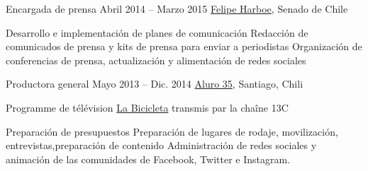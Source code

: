 \begin{joblist}
{		%
	}



\item[Encargada de prensa ]{Abril 2014 -- Marzo 2015}
     { \href{https://www.harboe.cl/}{Felipe Harboe}, Senado de Chile } 
	 {
                
		\iftbftiny \vspace{-0.5cm} \fi
			\begin{itemize}
			  \iftbftiny \setlength\itemsep{-3pt} \fi
			  \cvitem[\checkmark] Desarrollo e implementación de planes de comunicación
			  \cvitem[\checkmark] Redacción de comunicados de prensa y kits de prensa para enviar a periodistas
			  \cvitem[\checkmark] Organización de conferencias de prensa, actualización y alimentación de redes sociales
			\end{itemize}     
			
	}
    
    
    
\item[Productora general]{Mayo 2013 -- Dic. 2014}
     {\href{https://www.aluro35.com/}  {Aluro 35}, Santiago, Chili}
     {Programme de télévision \href{http://www.13.cl/c/programas/la-bicicleta}{La Bicicleta} transmis par la chaîne 13C \\
			
		\iftbftiny \vspace{-0.5cm} \fi
			\begin{itemize}
			  \iftbftiny \setlength\itemsep{-3pt} \fi
			  \cvitem[\checkmark] Preparación de presupuestos                
			  \cvitem[\checkmark] Preparación de lugares de rodaje, movilización, entrevistas,preparación de contenido
			  \cvitem[\checkmark] Administración de redes sociales y animación de las comunidades de Facebook, Twitter e Instagram.          
			\end{itemize}     
			
}
\end{joblist}
